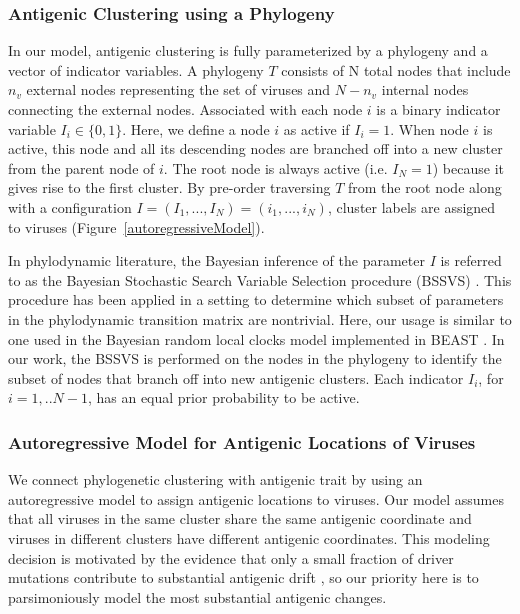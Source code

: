 \documentclass[11pt,oneside,letterpaper]{article}
\begin{document}
\subsubsection*{Antigenic Clustering using a Phylogeny}

In our model, antigenic clustering is fully parameterized by  a phylogeny and a vector of indicator variables.
A phylogeny $T$ consists of N total nodes that include $n_v$ external nodes representing the set of viruses and $N-n_v$ internal nodes connecting the external nodes.
Associated with each node $i$ is a binary indicator variable $I_i \in \{0,1\}$. 
Here, we define a node $i$ as active if $I_i = 1$.
When node $i$ is active, this node and all its descending nodes are branched off into a new cluster from the parent node of $i$.
The root node is always active (i.e. $I_{N} = 1$) because it gives rise to the first cluster.
By pre-order traversing $T$ from the root node along with a configuration $I=(I_1, ..., I_N)=(i_1, ..., i_N)$, cluster labels are assigned to viruses (Figure~\ref{autoregressiveModel}).


In phylodynamic literature, the Bayesian inference of the parameter $I$ is referred to as the Bayesian Stochastic Search Variable Selection procedure (BSSVS) \cite{lemey_bayesian_2009}.
This procedure has been applied in a setting to determine which subset of parameters in the phylodynamic transition matrix are nontrivial. 
Here, our usage is similar to one used in the Bayesian random local clocks model implemented in BEAST \cite{drummond_bayesian_2010}.
In our work, the BSSVS is performed on the nodes in the phylogeny to identify the subset of nodes that branch off into new antigenic clusters. 
Each indicator $I_i$, for $i=1,..N-1$, has an equal prior probability to be active.



\subsubsection*{Autoregressive Model for Antigenic Locations of Viruses}

We connect phylogenetic clustering with antigenic trait by using an autoregressive model to assign antigenic locations to viruses. 
Our model assumes that all viruses in the same cluster share the same antigenic coordinate and viruses in different clusters have different antigenic coordinates.
This modeling decision is motivated by the evidence that only a small fraction of driver mutations contribute to substantial antigenic drift \cite{koel_substitutions_2013}, so our priority here is to parsimoniously model the most substantial antigenic changes.
\end{document}
